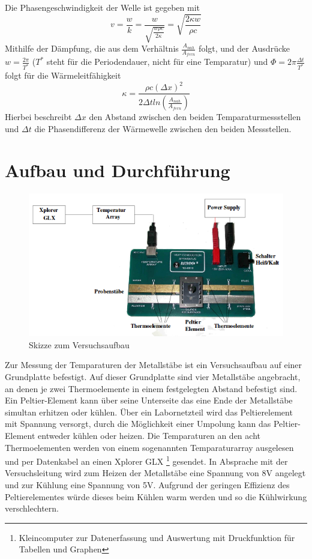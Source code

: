 \documentclass[11pt]{article}
\begin{document}
Die Phasengeschwindigkeit der Welle ist gegeben mit
\begin{equation}
v = \frac{w}{k} = \frac{w}{\sqrt{\frac{w \rho c}{2 \kappa}}} = \sqrt{\frac{2 \kappa w}{\rho c}}
\end{equation}
Mithilfe der Dämpfung, die aus dem Verhältnis $\frac{A_{nah}}{A_{fern}}$ folgt, und der Ausdrücke $w = \frac{2 \pi}{T^*}$ ($T^*$ steht für die Periodendauer, nicht für eine Temparatur) und $\Phi = 2 \pi \frac{\Delta t}{T^*}$ folgt für die Wärmeleitfähigkeit
\begin{equation}
\kappa = \frac{\rho c (\Delta x)^2}{2 \Delta t ln(\frac{A_{nah}}{A_{fern}})}
\end{equation}
Hierbei beschreibt $\Delta x$ den Abstand zwischen den beiden Temparaturmessstellen und $\Delta t$ die Phasendifferenz der Wärmewelle zwischen den beiden Messstellen.
\section{Aufbau und Durchf\"{u}hrung}
\begin{figure}[htp]
\centering
\includegraphics[width=\textwidth ]{Diagramme/v204aufbau.png}
\caption{Skizze zum Versuchsaufbau}
\label{aufbau}
\end{figure}
Zur Messung der Temparaturen der Metallstäbe ist ein Versuchsaufbau auf einer Grundplatte befestigt. Auf dieser Grundplatte sind vier Metallstäbe angebracht, an denen je zwei Thermoelemente in einem festgelegten Abstand befestigt sind. Ein Peltier-Element kann über seine Unterseite das eine Ende der Metallstäbe simultan erhitzen oder kühlen. Über ein Labornetzteil wird das Peltierelement mit Spannung versorgt, durch die Möglichkeit einer Umpolung kann das Peltier-Element entweder kühlen oder heizen. Die Temparaturen an den acht Thermoelementen werden von einem sogenannten Temparaturarray ausgelesen und per Datenkabel an einen Xplorer GLX \footnote{Kleincomputer zur Datenerfassung und Auswertung mit Druckfunktion für Tabellen und Graphen} gesendet.
In Absprache mit der Versuchsleitung wird zum Heizen der Metallstäbe eine Spannung von 8V angelegt und zur Kühlung eine Spannung von 5V. Aufgrund der geringen Effizienz des Peltierelementes würde dieses beim Kühlen warm werden und so die Kühlwirkung verschlechtern.
\end{document}
